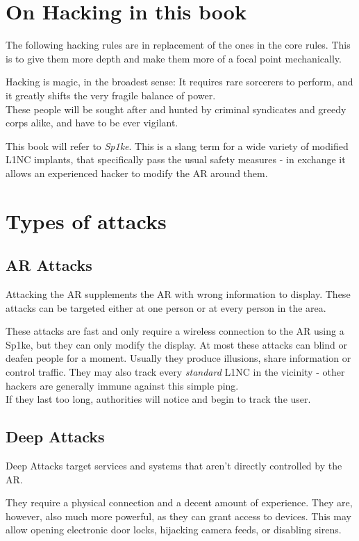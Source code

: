 \documentclass[12pt,a4paper,openany,usenames,dvipsnames]{book}
\def\modifiedlincname{Sp1ke}
\begin{document}
	

	\chapter{On Hacking in this book}
	The following hacking rules are in replacement of the ones in the core rules.
	This is to give them more depth and make them more of a focal point mechanically.
	\par
    Hacking is magic, in the broadest sense:
    It requires rare sorcerers to perform,
    and it greatly shifts the very fragile balance of power.
    \\%
    These people will be sought after and hunted by criminal syndicates and greedy corps alike,
    and have to be ever vigilant.
    \par
	\begin{exampleblock}
		This book will refer to \emph{\modifiedlincname}.
		This is a slang term for a wide variety of modified L1NC implants,
			that specifically pass the usual safety measures
			- in exchange it allows an experienced hacker to modify the AR around them.
	\end{exampleblock}
	
	\chapter{Types of attacks}
	\section{AR Attacks}
	Attacking the AR supplements the AR with wrong information to display.
	These attacks can be targeted either at one person or at every person in the area.
	\par
	These attacks are fast and only require a wireless connection to the AR using a \modifiedlincname,
		but they can only modify the display.
	At most these attacks can blind or deafen people for a moment.
	Usually they produce illusions, share information or control traffic.
	They may also track every \emph{standard} L1NC in the vicinity - other hackers are generally immune against this simple ping.
	\\%
	If they last too long, authorities will notice and begin to track the user.
	\section{Deep Attacks}
	Deep Attacks target services and systems that aren't directly controlled by the AR.
	\par
	They require a physical connection and a decent amount of experience.
	They are, however, also much more powerful, as they can grant access to devices.
	This may allow opening electronic door locks, hijacking camera feeds, or disabling sirens.
\end{document}
